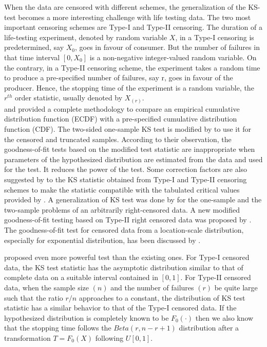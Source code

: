 \documentclass[12pt, reqno]{amsart}
\begin{document}
When the data are censored with different schemes, the generalization
of the KS-test becomes  a more interesting challenge with life testing data. 
The two most important  censoring schemes are Type-I and Type-II censoring.
The duration of a life-testing experiment, denoted by random variable $X$,
in a Type-I censoring is predetermined, say $X_{0}$, goes in favour of consumer.
But the number of failures in that time interval  $[0, X_0]$ is a non-negative
integer-valued random variable. On the contrary, in  a Type-II censoring scheme,
the experiment takes a random time to produce a  pre-specified number of failures,
say r, goes in favour of the producer.  Hence, the stopping time  of the experiment is a random variable, the $r^{th}$ order statistic, usually denoted by $X_{(r)}$.\\


\cite{kolmogorov_1933} and \cite{smirnov_1948} provided a complete methodology to compare an empirical cumulative distribution function
(ECDF) with a pre-specified cumulative distribution function (CDF).  The two-sided one-sample KS test is modified by
\cite{barr1973kolmogorov} to use  it for the censored and truncated samples.  According to their observation, the goodness-of-fit tests based on the modified test statistic are inappropriate when parameters of the hypothesized distribution are estimated from the data and used for the test. It reduces the power of the test. Some correction factors are also suggested by \cite{Dufour_1978} to the KS statistic obtained from Type-I and Type-II censoring schemes to make the statistic compatible with the tabulated critical values provided by \cite{Koziol}. A generalization of KS test was done by \cite{Fleming} for the one-sample and the two-sample problems of an arbitrarily right-censored data.  A new modified goodness-of-fit testing based on Type-II right censored data was proposed by \cite{lin2008new}. The goodness-of-fit test for censored data from a
location-scale distribution, especially for exponential distribution, has been discussed by \cite{castro2011goodness}.


\cite{zhang}   proposed even more powerful test than the existing ones. For Type-I censored data, the KS test statistic has the asymptotic distribution similar to that of complete data on a suitable interval contained in $[0,1]$. For Type-II censored data, when the sample size $(n)$ and the number of failures $(r)$ be quite large such that the ratio $r/n$ approaches to a constant, the distribution of KS test statistic has a similar behavior to that of the Type-I censored data. If the hypothesized distribution is completely known to be $F_0(\cdot)$ then  we also know that the stopping time  follows the  $Beta(r, n - r + 1)$ distribution
after a transformation $T=F_0(X)$ following $U[0,1].$ \\    
\end{document}
